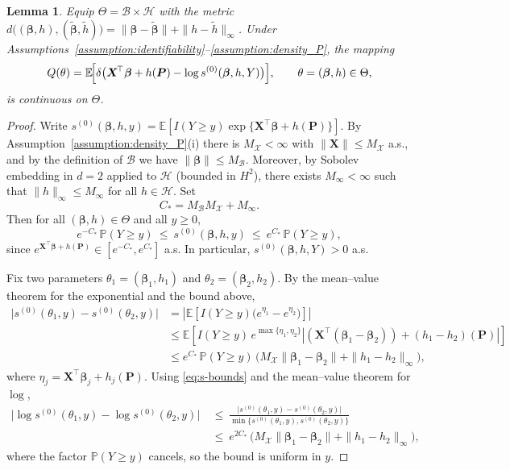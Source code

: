 \documentclass[11pt]{article}
\newtheorem{lemma}{Lemma}
\begin{document}
	
	\begin{lemma}\label{lem:Q_continuous}
		Equip $\Theta=\mathcal B\times\mathcal H$ with the metric
		\(d\bigl((\bm \beta,h),(\tilde{\bm \beta},\tilde h)\bigr)=
		\|\bm \beta-\tilde{\bm\beta}\|+\|h-\tilde h\|_{\infty}\).
		Under Assumptions~\ref{assumption:identifiability}–\ref{assumption:density_P},
		the mapping
		\[
		Q(\theta)=\mathbb E\!\Bigl[
		\delta\bigl(\bm X^{\!\top}\bm \beta
		+h(\bm P)
		-\log s^{(0)}(\bm \beta,h,Y)\bigr)
		\Bigr],
		\qquad \theta=(\bm \beta,h)\in\Theta,
		\]
		is continuous on \(\Theta\).
	\end{lemma}
     \begin{proof}
    Write $s^{(0)}(\bm\beta,h,y)=\mathbb E\!\left[I(Y\ge y)\exp\{\bm X^{\!\top}\bm\beta+h(\bm P)\}\right]$.
    By Assumption~\ref{assumption:density_P}(i) there is $M_{\mathcal X}<\infty$ with
    $\|\bm X\|\le M_{\mathcal X}$ a.s., and by the definition of $\mathcal B$ we have
    $\|\bm\beta\|\le M_{\mathcal B}$. Moreover, by Sobolev embedding in $d=2$
    applied to $\mathcal H$ (bounded in $H^2$), there exists $M_\infty<\infty$ such that
    $\|h\|_\infty\le M_\infty$ for all $h\in\mathcal H$. Set
    \[
    C_*=M_{\mathcal B}M_{\mathcal X}+M_\infty.
    \]
    Then for all $(\bm\beta,h)\in\Theta$ and all $y\ge 0$,
    \begin{equation}\label{eq:s-bounds}
    e^{-C_*}\,\mathbb P(Y\ge y)\ \le\ s^{(0)}(\bm\beta,h,y)\ \le\ e^{C_*}\,\mathbb P(Y\ge y),
    \end{equation}
    since $e^{\bm X^\top\bm\beta+h(\bm P)}\in[e^{-C_*},e^{C_*}]$ a.s.  In particular,
    $s^{(0)}(\bm\beta,h,Y)>0$ a.s.
    
    Fix two parameters $\theta_1=(\bm\beta_1,h_1)$ and $\theta_2=(\bm\beta_2,h_2)$.
    By the mean–value theorem for the exponential and the bound above,
    \[
    \begin{aligned}
    \big|s^{(0)}(\theta_1,y)-s^{(0)}(\theta_2,y)\big|
    &= \left|\mathbb E\!\left[I(Y\ge y)\big(e^{\eta_1}-e^{\eta_2}\big)\right]\right| \\
    &\le \mathbb E\!\left[I(Y\ge y)\,e^{\max\{\eta_1,\eta_2\}}
    \left|(\bm X^\top(\bm\beta_1-\bm\beta_2))+(h_1-h_2)(\bm P)\right|\right] \\
    &\le e^{C_*}\,\mathbb P(Y\ge y)\,\big(M_{\mathcal X}\|\bm\beta_1-\bm\beta_2\|
    +\|h_1-h_2\|_\infty\big),
    \end{aligned}
    \]
    where $\eta_j=\bm X^\top\bm\beta_j+h_j(\bm P)$.
    Using \eqref{eq:s-bounds} and the mean–value theorem for $\log$,
    \begin{align*}
    \big|\log s^{(0)}(\theta_1,y)-\log s^{(0)}(\theta_2,y)\big|
    \ &\le\ \frac{\big|s^{(0)}(\theta_1,y)-s^{(0)}(\theta_2,y)\big|}
    {\min\{s^{(0)}(\theta_1,y),s^{(0)}(\theta_2,y)\}}\\
    \ &\le\ e^{2C_*}\,\big(M_{\mathcal X}\|\bm\beta_1-\bm\beta_2\|
    +\|h_1-h_2\|_\infty\big),
    \end{align*}
    where the factor $\mathbb P(Y\ge y)$ cancels, so the bound is uniform in $y$.
    

\end{proof}
\end{document}
